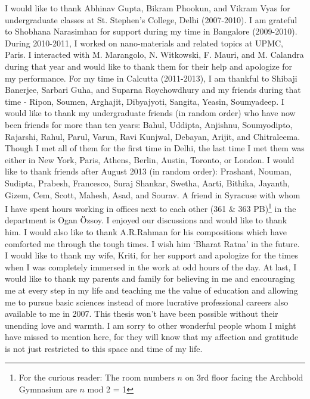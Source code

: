 I would like to thank Abhinav Gupta, Bikram Phookun, and Vikram Vyas for undergraduate classes at  
St. Stephen's College, Delhi (2007-2010). I am grateful to Shobhana Narasimhan for support during my time
in Bangalore (2009-2010). During 2010-2011, I worked on nano-materials and related topics at UPMC, 
Paris. I interacted with M. Marangolo, N. Witkowski, F. Mauri, and M. Calandra during that year and would like
to thank them for their help and apologize for my performance. For my time in Calcutta (2011-2013), 
I am thankful to Shibaji Banerjee, Sarbari Guha, and Suparna Roychowdhury and my friends during that time - 
Ripon, Soumen, Arghajit, Dibyajyoti, Sangita, Yeasin, Soumyadeep. 
I would like to thank my undergraduate friends (in random order) who have now been friends for 
more than ten years: Bahul, Uddipta, Anjishnu, Soumyodipto, Rajarshi, Rahul, Parul, Varun, 
Ravi Kunjwal, Debayan, Arijit, and Chitraleema. Though I met all of them for the first time in Delhi, the 
last time I met them was either in 
New York, Paris, Athens, Berlin, Austin, Toronto, or London. I would like to thank friends after 
August 2013 (in random order): Prashant, Nouman, Sudipta, Prabesh, Francesco, Suraj Shankar, Swetha, 
Aarti, Bithika, Jayanth, Gizem, Cem, Scott, Mahesh, Asad, and Sourav. 
A friend in Syracuse with whom I have spent hours working in offices next to each 
other (361 \& 363 PB)\footnote{For the curious reader: The room numbers $n$ on 3rd floor facing the 
Archbold Gymnasium are $\textit{n}$ mod 2 = 1} in 
the department is Ogan \"{O}zsoy. I enjoyed our discussions and would like to thank him. I would 
also like to thank A.R.Rahman for his compositions which have comforted me through the tough times. 
I wish him `Bharat Ratna' in the future. I would like to thank my wife, Kriti, for her support and 
apologize for the times when I was completely immersed in the work at odd 
hours of the day. At last, I would like to thank my parents and family for believing in me and encouraging me 
at every step in my life and teaching me the value of education and allowing me to pursue basic sciences 
instead of more lucrative professional careers also available to me in 2007. This thesis won't have been possible 
without their unending love and warmth. I am sorry to other wonderful people whom I might have missed to 
mention here, for they will know that my affection and gratitude is not just restricted to this space and time 
of my life.
